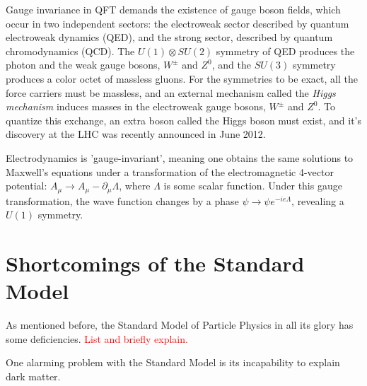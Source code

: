 Gauge invariance in QFT demands the existence of gauge boson fields, which occur in two independent sectors: the electroweak sector described by quantum electroweak dynamics (QED), and the strong sector, described by quantum chromodynamics (QCD).  The $U(1)\otimes SU(2)$ symmetry of QED produces the photon and the weak gauge bosons, $W^\pm$ and $Z^0$, and the $SU(3)$ symmetry produces a color octet of massless gluons.  For the symmetries to be exact, all the force carriers must be massless, and an external mechanism called the \textit{Higgs mechanism} induces masses in the electroweak gauge bosons, $W^\pm$ and $Z^0$.  To quantize this exchange, an extra boson called the Higgs boson must exist, and it's discovery at the LHC was recently announced in June 2012.

Electrodynamics is 'gauge-invariant', meaning one obtains the same solutions to Maxwell's equations under a transformation of the electromagnetic 4-vector potential: $A_\mu \rightarrow A_\mu - \partial_\mu\Lambda$, where $\Lambda$ is some scalar function.  Under this gauge transformation, the wave function changes by a phase $\psi\rightarrow\psi e^{-ie\Lambda}$, revealing a $U(1)$ symmetry.

\iffalse
\section{Higgs Mechanism and Gauge Boson Masses}
\label{sec:higgs}
Explain local SU(2) gauge symmetry breaking, the production of the Higgs boson and how this allows for massive weakly interacting gauge bosons.
\fi

\section{Shortcomings of the Standard Model}
\label{sec:fail}
As mentioned before, the Standard Model of Particle Physics in all its glory has some deficiencies. \textcolor{red}{List and briefly explain.}

One alarming problem with the Standard Model is its incapability to explain dark matter.

